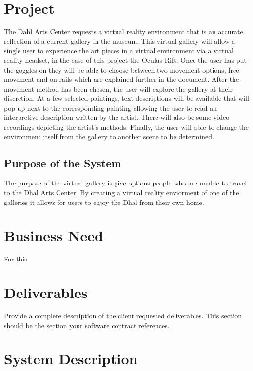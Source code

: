 \section{Project}
The Dahl Arts Center requests a virtual reality environment that is an accurate reflection of a current gallery in the museum.  This virtual gallery will allow a single user to experience the art pieces in a virtual environment via a virtual reality headset, in the case of this project the Oculus Rift.  Once the user has put the goggles on they will be able to choose between two movement options, free movement and on-rails which are explained further in the document.  After the movement method has been chosen, the user will explore the gallery at their discretion.  At a few selected paintings, text descriptions will be available that will pop up next to the corresponding painting allowing the user to read an interpretive description written by the artist.  There will also be some video recordings depicting the artist's methods.  Finally, the user will able to change the environment itself from the gallery to another scene to be determined. 

\subsection{Purpose of the System}
The purpose of the virtual gallery is give options people who are unable to travel to the Dhal Arts Center. By creating a virtual reality enviorment of one of the galleries it allows for users to enjoy the Dhal from their own home. 


\section{Business Need}
For this 

\section{Deliverables}

Provide a complete description of the client requested deliverables.   This section should be the section your software contract references.   

\section{System Description}

